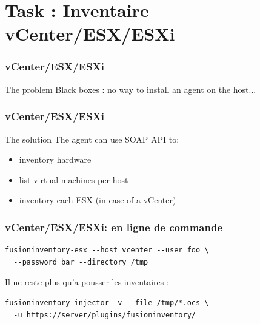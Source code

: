 \documentclass{beamer}
\begin{document}
\section{Task : Inventaire vCenter/ESX/ESXi}


\begin{frame}
    \frametitle{vCenter/ESX/ESXi}

    \begin{block}{The problem}
    Black boxes : no way to install an agent on the host...
    \end{block}


\end{frame}

\begin{frame}
    \frametitle{vCenter/ESX/ESXi}

    \begin{block}{The solution}
    The agent can use SOAP API to:
        \begin{itemize}
                \item inventory hardware
                \item list virtual machines per host
                \item inventory each ESX (in case of a vCenter)
        \end{itemize}
    \end{block}

\end{frame}

\begin{frame}[fragile]
    \frametitle{vCenter/ESX/ESXi: en ligne de commande}

\begin{lstlisting}
fusioninventory-esx --host vcenter --user foo \ 
  --password bar --directory /tmp
\end{lstlisting}

Il ne reste plus qu'a pousser les inventaires :
\begin{lstlisting}
fusioninventory-injector -v --file /tmp/*.ocs \ 
  -u https://server/plugins/fusioninventory/
\end{lstlisting}

\end{frame}
\end{document}
